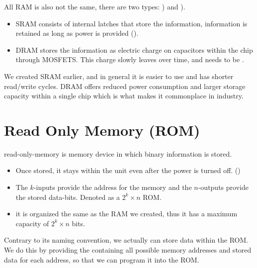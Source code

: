 All RAM is also not the same, there are two types: ) and ).
\begin{itemize}
	\item SRAM consists of internal latches that store the information, information is retained as long as power is provided ().
	\item DRAM stores the information as electric charge on capacitors within the chip through MOSFETS. This charge slowly leaves over time, and needs to be .
\end{itemize}
We created SRAM earlier, and in general it is easier to use and has shorter read/write cycles. DRAM offers reduced power consumption and larger storage capacity within a single chip which is what makes it commonplace in industry.

\section{Read Only Memory (ROM)}

read-only-memory is memory device in which  binary information is stored.
\begin{itemize}
	\item Once stored, it stays within the unit even after the power is turned off. ()
	\item The $k$-inputs provide the address for the memory and the $n$-outputs provide the stored data-bits. Denoted as a $2^k \times n$ ROM.
	\item it is organized the same as the RAM we created, thus it has a maximum capacity of $2^k \times n$ bits.
\end{itemize}

Contrary to its naming convention, we actually can store data within the ROM. We do this by providing the  containing all possible memory addresses and stored data for each address, so that we can program it into the ROM. 



